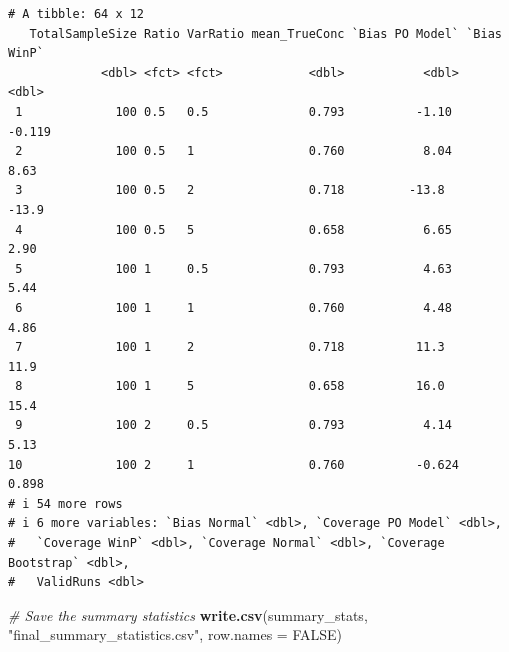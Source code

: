 \documentclass[
  letterpaper,
  DIV=11,
  numbers=noendperiod]{scrartcl}
\newenvironment{Shaded}{\begin{snugshade}}{\end{snugshade}}
\newcommand{\AttributeTok}[1]{\textcolor[rgb]{0.13,0.29,0.53}{#1}}
\newcommand{\CommentTok}[1]{\textcolor[rgb]{0.56,0.35,0.01}{\textit{#1}}}
\newcommand{\ConstantTok}[1]{\textcolor[rgb]{0.56,0.35,0.01}{#1}}
\newcommand{\FunctionTok}[1]{\textcolor[rgb]{0.13,0.29,0.53}{\textbf{#1}}}
\newcommand{\NormalTok}[1]{#1}
\newcommand{\StringTok}[1]{\textcolor[rgb]{0.31,0.60,0.02}{#1}}
\begin{document}
\begin{verbatim}
# A tibble: 64 x 12
   TotalSampleSize Ratio VarRatio mean_TrueConc `Bias PO Model` `Bias WinP`
             <dbl> <fct> <fct>            <dbl>           <dbl>       <dbl>
 1             100 0.5   0.5              0.793          -1.10       -0.119
 2             100 0.5   1                0.760           8.04        8.63 
 3             100 0.5   2                0.718         -13.8       -13.9  
 4             100 0.5   5                0.658           6.65        2.90 
 5             100 1     0.5              0.793           4.63        5.44 
 6             100 1     1                0.760           4.48        4.86 
 7             100 1     2                0.718          11.3        11.9  
 8             100 1     5                0.658          16.0        15.4  
 9             100 2     0.5              0.793           4.14        5.13 
10             100 2     1                0.760          -0.624       0.898
# i 54 more rows
# i 6 more variables: `Bias Normal` <dbl>, `Coverage PO Model` <dbl>,
#   `Coverage WinP` <dbl>, `Coverage Normal` <dbl>, `Coverage Bootstrap` <dbl>,
#   ValidRuns <dbl>
\end{verbatim}

\begin{Shaded}
\begin{Highlighting}[]
\CommentTok{\# Save the summary statistics}
\FunctionTok{write.csv}\NormalTok{(summary\_stats, }\StringTok{"final\_summary\_statistics.csv"}\NormalTok{, }\AttributeTok{row.names =} \ConstantTok{FALSE}\NormalTok{)}
\end{Highlighting}
\end{Shaded}
\end{document}

